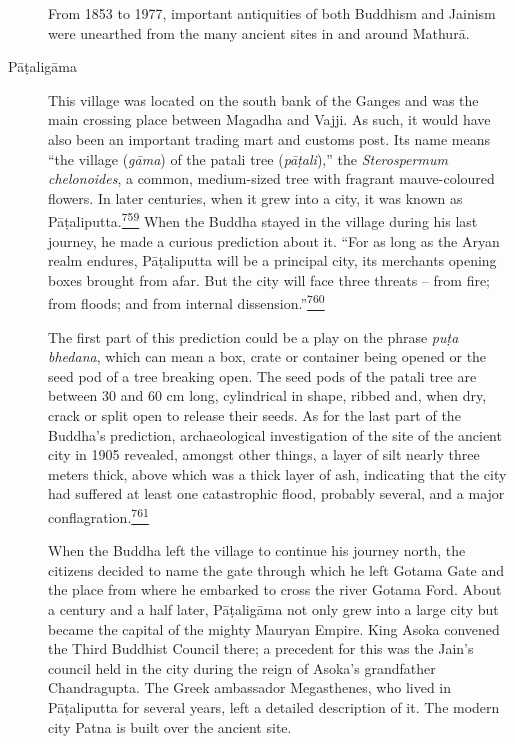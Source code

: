 \begin{description}
From 1853 to 1977, important antiquities of both Buddhism and Jainism
were unearthed from the many ancient sites in and around Mathurā.
\item[Pāṭaligāma]
This village was located on the south bank of the Ganges and was the
main crossing place between Magadha and Vajji. As such, it would have
also been an important trading mart and customs post. Its name means
``the village (\emph{gāma}) of the patali tree (\emph{pāṭali}),'' the
\emph{Sterospermum chelonoides}, a common, medium-sized tree with
fragrant mauve-coloured flowers. In later centuries, when it grew into a
city, it was known as
Pāṭaliputta.\label{footprints_split_019.html_fnref759}\hyperref[footprints_split_025.htmlux5cux23fn759]{\textsuperscript{759}}
When the Buddha stayed in the village during his last journey, he made a
curious prediction about it. ``For as long as the Aryan realm endures,
Pāṭaliputta will be a principal city, its merchants opening boxes
brought from afar. But the city will face three threats -- from fire;
from floods; and from internal
dissension.''\label{footprints_split_019.html_fnref760}\hyperref[footprints_split_025.htmlux5cux23fn760]{\textsuperscript{760}}

The first part of this prediction could be a play on the phrase
\emph{puṭa bhedana}, which can mean a box, crate or container being
opened or the seed pod of a tree breaking open. The seed pods of the
patali tree are between 30 and 60 cm long, cylindrical in shape, ribbed
and, when dry, crack or split open to release their seeds. As for the
last part of the Buddha's prediction, archaeological investigation of
the site of the ancient city in 1905 revealed, amongst other things, a
layer of silt nearly three meters thick, above which was a thick layer
of ash, indicating that the city had suffered at least one catastrophic
flood, probably several, and a major
conflagration.\label{footprints_split_019.html_fnref761}\hyperref[footprints_split_025.htmlux5cux23fn761]{\textsuperscript{761}}

When the Buddha left the village to continue his journey north, the
citizens decided to name the gate through which he left Gotama Gate and
the place from where he embarked to cross the river Gotama Ford. About a
century and a half later, Pāṭaligāma not only grew into a large city but
became the capital of the mighty Mauryan Empire. King Asoka convened the
Third Buddhist Council there; a precedent for this was the Jain's
council held in the city during the reign of Asoka's grandfather
Chandragupta. The Greek ambassador Megasthenes, who lived in Pāṭaliputta
for several years, left a detailed description of it. The modern city
Patna is built over the ancient site.


\end{description}

